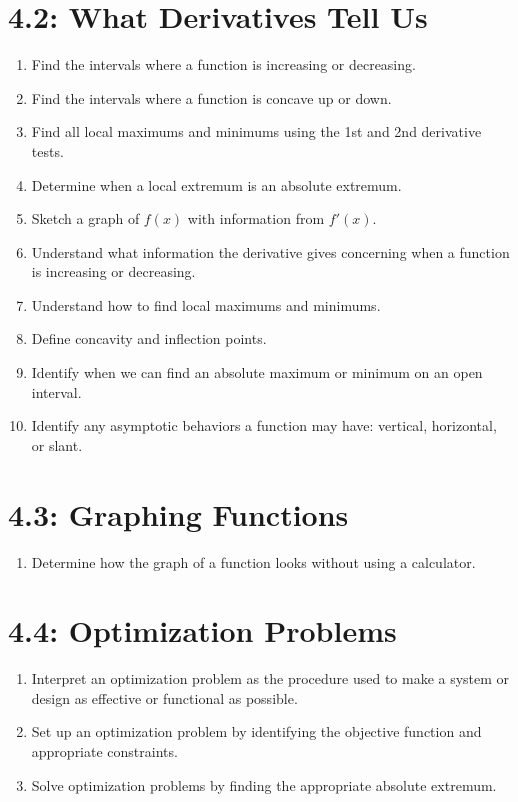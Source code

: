 \documentclass[11pt]{article}
\begin{document}
\section*{4.2: What Derivatives Tell Us}
\begin{enumerate}
	\item Find the intervals where a function is increasing or decreasing.
	\item Find the intervals where a function is concave up or down.
	\item Find all local maximums and minimums using the 1st and 2nd derivative tests.
	\item Determine when a local extremum is an absolute extremum.
	\item Sketch a graph of $f(x)$ with information from $f'(x)$.
	\item Understand what information the derivative gives concerning when a function is increasing or decreasing.
	\item Understand how to find local maximums and minimums.
	\item Define concavity and inflection points.
	\item Identify when we can find an absolute maximum or minimum on an open interval.
	\item Identify any asymptotic behaviors a function may have: vertical, horizontal, or slant.
\end{enumerate}

\section*{4.3: Graphing Functions}
\begin{enumerate}
	\item Determine how the graph of a function looks without using a calculator.
\end{enumerate}

\section*{4.4: Optimization Problems}
\begin{enumerate}
	\item Interpret an optimization problem as the procedure used to make a system or design as effective or functional as possible.
	\item Set up an optimization problem by identifying the objective function and appropriate constraints.
	\item Solve optimization problems by finding the appropriate absolute extremum.
\end{enumerate}
\end{document}
